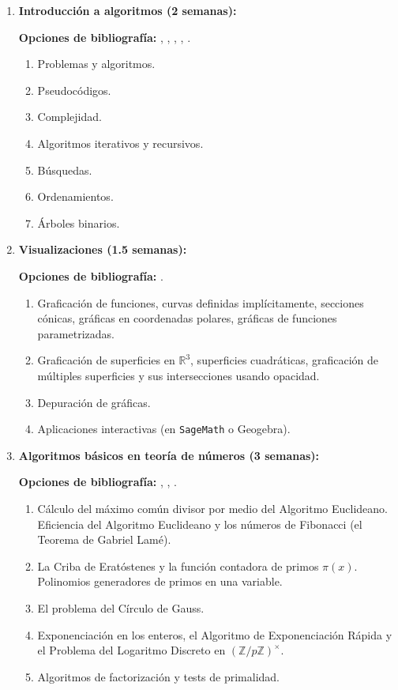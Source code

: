 \begin{refsection}
\begin{enumerate}
\item \textbf{Introducción a algoritmos (2 semanas):}

\textbf{Opciones de bibliografía:} \cite{Knu97}, \cite{CLR--IntroToAlgorithms}, \cite{Ueh19}, \cite{Fer17}, \cite{GKP--ConcreteMathematics}.

\begin{enumerate} 
    \item Problemas y algoritmos.
    \item Pseudocódigos.
    \item Complejidad.
    \item Algoritmos iterativos y recursivos.
    \item Búsquedas.
    \item Ordenamientos.
    \item Árboles binarios.
\end{enumerate}

\item \textbf{Visualizaciones (1.5 semanas):}

\textbf{Opciones de bibliografía:} \cite{Mez15}.

\begin{enumerate} 
    \item Graficación de funciones, curvas definidas implícitamente, secciones cónicas, gráficas en coordenadas polares, gráficas de funciones parametrizadas. 
    \item Graficación de superficies en $\mathbb{R}^3$, superficies cuadráticas, graficación de múltiples superficies y sus intersecciones usando opacidad.
    \item Depuración de gráficas. %
    \item Aplicaciones interactivas (en \texttt{SageMath} o Geogebra).
\end{enumerate}

\item \textbf{Algoritmos básicos en teoría de números (3 semanas):}

\textbf{Opciones de bibliografía:} \cite{Hut18}, \cite{BuhlerWagon2008}, \cite[Capítulo 12]{BRR15}.


\begin{enumerate} 
    \item Cálculo del máximo común divisor por medio del Algoritmo Euclideano. Eficiencia del Algoritmo Euclideano y los números de Fibonacci (el Teorema de Gabriel Lamé).
    \item La Criba de Eratóstenes y la función contadora de primos $\pi(x)$. Polinomios generadores de primos en una variable.
    \item El problema del Círculo de Gauss.
    \item Exponenciación en los enteros, el Algoritmo de Exponenciación Rápida y el Problema del Logaritmo Discreto en $(\mathbb{Z}/p\mathbb{Z})^{\times}$.
    \item Algoritmos de factorización y tests de primalidad.
\end{enumerate}


\end{enumerate}
\end{refsection}
